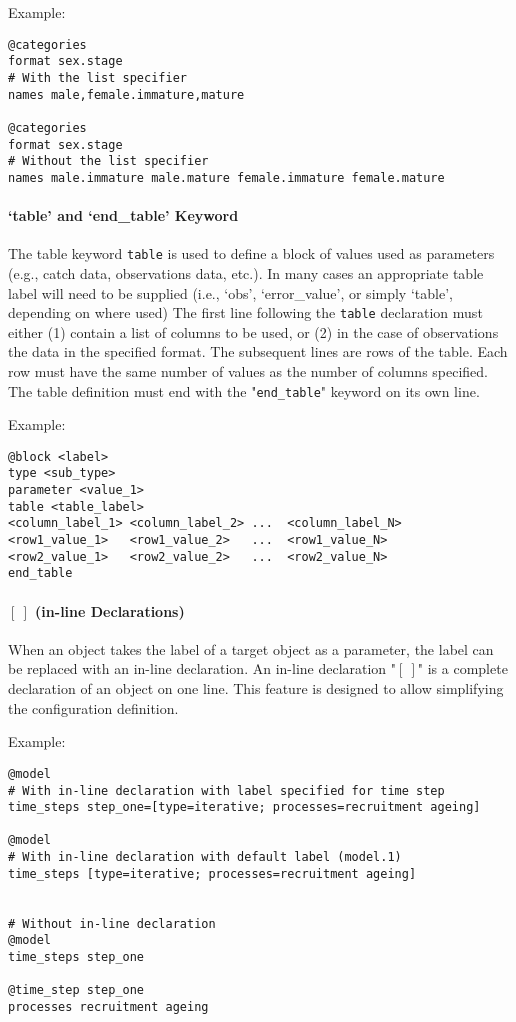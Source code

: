 Example:

{\small{\begin{verbatim}
@categories
format sex.stage
# With the list specifier
names male,female.immature,mature

@categories
format sex.stage
# Without the list specifier
names male.immature male.mature female.immature female.mature
\end{verbatim}}}

\paragraph*{`table' and `end\_table' Keyword}\label{sec:DataTable}

The table keyword \texttt{table} is used to define a block of values used as parameters (e.g., catch data, observations data, etc.). In many cases an appropriate table label will need to be supplied (i.e., `obs', `error\_value', or simply `table', depending on where used) The first line following the \texttt{table} declaration must either (1) contain a list of columns to be used, or (2) in the case of observations the data in the specified format. The subsequent lines are rows of the table. Each row must have the same number of values as the number of columns specified. The table definition must end with the "\texttt{end\_table}" keyword on its own line.

Example:

{\small{\begin{verbatim}
@block <label>
type <sub_type>
parameter <value_1>
table <table_label>
<column_label_1> <column_label_2> ...  <column_label_N>
<row1_value_1>   <row1_value_2>   ...  <row1_value_N>
<row2_value_1>   <row2_value_2>   ...  <row2_value_N>
end_table
\end{verbatim}}}

\paragraph*{$[\ ]$ (in-line Declarations)}

When an object takes the label of a target object as a parameter, the label can be replaced with an in-line declaration. An in-line declaration "\texttt{$[\ ]$}" is a complete declaration of an object on one line. This feature is designed to allow simplifying the configuration definition.

Example:

{\small{\begin{verbatim}
@model
# With in-line declaration with label specified for time step
time_steps step_one=[type=iterative; processes=recruitment ageing]

@model
# With in-line declaration with default label (model.1)
time_steps [type=iterative; processes=recruitment ageing]


# Without in-line declaration
@model
time_steps step_one

@time_step step_one
processes recruitment ageing
\end{verbatim}}}

